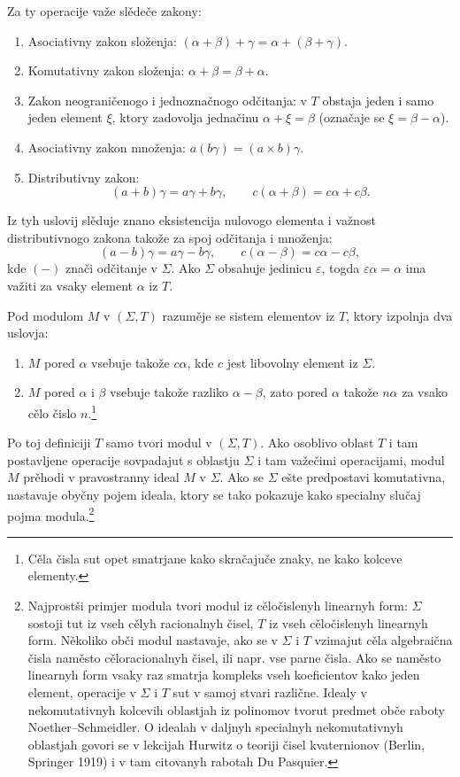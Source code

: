 \documentclass[11pt]{article}
\begin{document}
Za ty operacije važe slědeče zakony:
\begin{enumerate}
\item Asociativny zakon složenja: \((\alpha+\beta)+\gamma=\alpha+(\beta+\gamma)\).
\item Komutativny zakon složenja: \(\alpha+\beta=\beta+\alpha\).
\item Zakon neograničenogo i jednoznačnogo odčitanja: v \(T\) obstaja jeden i samo jeden element \(\xi\), ktory zadovolja jednačinu \(\alpha+\xi=\beta\) (označaje se \(\xi=\beta-\alpha\)).
\item Asociativny zakon množenja: \(a(b\gamma)=(a\times b)\gamma\).
\item Distributivny zakon:
\[
 (a+b)\gamma=a\gamma+b\gamma,\qquad c(\alpha+\beta)=c\alpha+c\beta.
\]
\end{enumerate}
Iz tyh uslovij slěduje znano eksistencija nulovogo elementa i važnost distributivnogo zakona takože za spoj odčitanja i množenja:
\[
 (a-b)\gamma=a\gamma-b\gamma,\qquad c(\alpha-\beta)=c\alpha-c\beta,
\]
kde \((-)\) znači odčitanje v \(\Sigma\). Ako \(\Sigma\) obsahuje jedinicu \(\varepsilon\), togda \(\varepsilon\alpha=\alpha\) ima važiti za vsaky element \(\alpha\) iz \(T\).

Pod modulom \(M\) v \((\Sigma,T)\) razuměje se sistem elementov iz \(T\), ktory izpolnja dva uslovja:
\begin{enumerate}
\item \(M\) pored \(\alpha\) vsebuje takože \(c\alpha\), kde \(c\) jest libovolny element iz \(\Sigma\).
\item \(M\) pored \(\alpha\) i \(\beta\) vsebuje takože razliko \(\alpha-\beta\), zato pored \(\alpha\) takože \(n\alpha\) za vsako cělo čislo \(n\).\footnote{Cěla čisla sut opet smatrjane kako skračajuče znaky, ne kako kolceve elementy.}
\end{enumerate}
Po toj definiciji \(T\) samo tvori modul v \((\Sigma,T)\). Ako osoblivo oblast \(T\) i tam postavljene operacije sovpadajut s oblastju \(\Sigma\) i tam važečimi operacijami, modul \(M\) prěhodi v pravostranny ideal \(M\) v \(\Sigma\). Ako se \(\Sigma\) ešte predpostavi komutativna, nastavaje obyčny pojem ideala, ktory se tako pokazuje kako specialny slučaj pojma modula.\footnote{Najprostši primjer modula tvori modul iz cěločislenyh linearnyh form: \(\Sigma\) sostoji tut iz vseh cělyh racionalnyh čisel, \(T\) iz vseh cěločislenyh linearnyh form. Několiko obči modul nastavaje, ako se v \(\Sigma\) i \(T\) vzimajut cěla algebraična čisla naměsto cěloracionalnyh čisel, ili napr. vse parne čisla. Ako se naměsto linearnyh form vsaky raz smatrja kompleks vseh koeficientov kako jeden element, operacije v \(\Sigma\) i \(T\) sut v samoj stvari različne. Idealy v nekomutativnyh kolcevih oblastjah iz polinomov tvorut predmet obče raboty Noether--Schmeidler. O idealah v daljnyh specialnyh nekomutativnyh oblastjah govori se v lekcijah Hurwitz o teoriji čisel kvaternionov (Berlin, Springer 1919) i v tam citovanyh rabotah Du Pasquier.}
\end{document}
